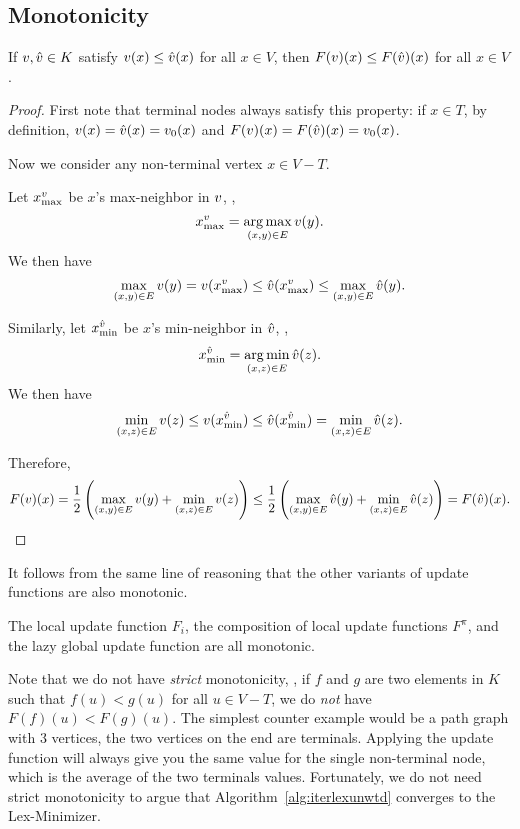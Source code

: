 \documentclass[12pt]{amsart}
\DeclareMathOperator*{\argmin}{arg\,min}
\DeclareMathOperator*{\argmax}{arg\,max}
\begin{document}
\subsection{Monotonicity}
\begin{lemma}\label{lem:monotonicity}
If $v, \hat{v}\in K$ satisfy $v(x)\leq \hat{v}(x)$ for all $x\in V$, then $F(v)(x) \leq F(\hat{v})(x)$ for all $x\in V$.
\end{lemma}
\begin{proof}
First note that terminal nodes always satisfy this property: if $x\in T$, by definition, $v(x) = \hat{v}(x) = v_0(x)$ and $F(v)(x) = F(\hat{v})(x) = v_0(x)$.

Now we consider any non-terminal vertex $x\in V-T$.

Let $x^{v}_{\max}$ be $x$'s max-neighbor in $v$, \ie, $$x^{\V{v}}_{\max} = \argmax_{(x,y)\in E}\V{v}(y).$$ We then have
$$\max_{(x,y)\in E}v(y) = v(x^{v}_{\max}) \leq \hat{v}(x^{v}_{\max}) \leq \max_{(x,y)\in E} \hat{v}(y).$$

Similarly, let $x^{\hat{v}}_{\min}$ be $x$'s min-neighbor in $\hat{v}$, \ie, $$x^{\V{\hat{v}}}_{\min} = \argmin_{(x,z)\in E}\V{\hat{v}}(z).$$ We then have
$$\min_{(x,z)\in E}v(z) \leq v(x^{\hat{v}}_{\min}) \leq \hat{v}(x^{\hat{v}}_{\min}) = \min_{(x,z)\in E} \hat{v}(z).$$

Therefore, $$ F(v)(x) = \frac{1}{2}\left({\max_{(x,y)\in E}v(y)+\min_{(x,z)\in E}v(z)}\right) \leq \frac{1}{2}\left({\max_{(x,y)\in E}\hat{v}(y)+\min_{(x,z)\in E}\hat{v}(z)}\right) = F(\hat{v})(x).$$

\end{proof}

It follows from the same line of reasoning that the other variants of update functions are also monotonic.

\begin{corollary}\label{cor:monotonicity}
The local update function $F_i$, the composition of local update functions $F^\pi$, and the lazy global update function are all monotonic.
\end{corollary}

Note that we do not have \emph{strict} monotonicity, \ie, if $f$ and $g$ are two elements in $K$ such that $f(u) < g(u)$ for all $u\in V - T$, we do \emph{not} have $F(f)(u) < F(g)(u)$. The simplest counter example would be a path graph with $3$ vertices, the two vertices on the end are terminals. Applying the update function will always give you the same value for the single non-terminal node, which is the average of the two terminals values. Fortunately, we do not need strict monotonicity to argue that Algorithm~\ref{alg:iterlexunwtd} converges to the Lex-Minimizer.
\end{document}
